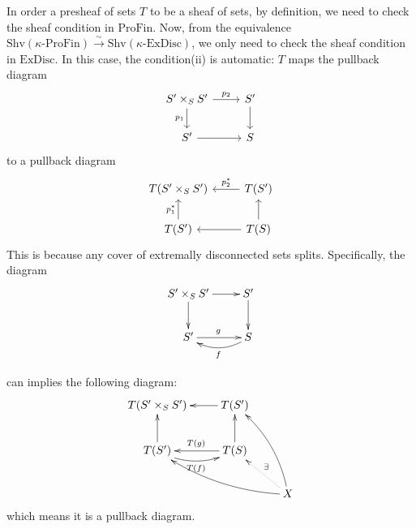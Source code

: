 \documentclass[UTF8,12,a4paper]{ctexart}
\theoremstyle{definition}
\begin{document}
\rem 
In order a presheaf of sets $T$ to be a sheaf of sets, by definition, we need to check the sheaf condition in $\text{ProFin}$. Now, from the equivalence $\text{Shv}(\kappa\text{-ProFin})\stackrel{\sim}{\longrightarrow}\text{Shv}(\kappa\text{-ExDisc})$, we only need to check the sheaf condition in $\text{ExDisc}$. In this case, the condition(ii) is automatic:
 $T$ maps the pullback diagram
\begin{equation*}		
\begin{tikzcd}
S^\prime\times_{S} S^\prime \arrow[d, "p_1"'] \arrow[r, "p_2"] & S^\prime \arrow[d] \\
S^\prime \arrow[r]                                             & S                 
\end{tikzcd}
\end{equation*}
to a pullback diagram
\begin{equation*}	
\begin{tikzcd}
T(S^\prime\times_{S} S^\prime) & T(S^\prime) \arrow[l, "p_2^*"'] \\
T(S^\prime) \arrow[u, "p_1^*"] & T(S) \arrow[l] \arrow[u]       
\end{tikzcd}
\end{equation*}
This is because any cover of extremally disconnected sets splits. Specifically, the diagram
\begin{equation*}
\xymatrix{
	S^\prime\times_S S^\prime\ar[r] \ar[d] & S^\prime \ar[d] \\
	S^\prime\ar[r]^g &S\ar@/^9pt/[l]^f
}
\end{equation*}

can implies the following diagram:
\begin{equation*}
\xymatrix{
	T(S^\prime\times_S S^\prime)  & T(S^\prime) \ar[l] &\\
	T(S^\prime)\ar[u]\ar@/_9pt/[r]_{T(f)} &  T(S)\ar[l]_{T(g)} \ar[u]&\\
	 & &X \ar@/_9pt/[luu]\ar@/^9pt/[llu]\ar@{.>}[lu]_{\exists}
}
\end{equation*}
which means it is a pullback diagram.
\end{document}
